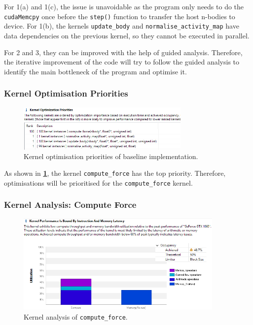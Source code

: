 \documentclass[12pt, a4paper]{article}
\let\oldcref\cref
\renewcommand{\cref}[1]{\textbf{\oldcref{#1}}}
\begin{document}
For 1(a) and 1(c), the issue is unavoidable as the program only needs to do the \texttt{cudaMemcpy}
once before the \texttt{step()} function to transfer the host n-bodies to device. For 1(b), the
kernels \texttt{update\_body} and \texttt{normalise\_activity\_map} have data dependencies on the
previous kernel, so they cannot be executed in parallel.

For 2 and 3, they can be improved with the help of guided analysis. Therefore, the iterative
improvement of the code will try to follow the guided analysis to identify the main bottleneck of
the program and optimise it.

\subsubsection{Kernel Optimisation Priorities}
\begin{figure}[H]
  \centering
  \includegraphics[width=0.75\textwidth]{images/baseline_kernel_optimisation_priorities.png}
  \caption{Kernel optimisation priorities of baseline implementation.}
  \label{figure:baseline_kernel_optimisation_priority}
\end{figure}

As shown in \cref{figure:baseline_kernel_optimisation_priority}, the kernel \texttt{compute\_force}
has the top priority. Therefore, optimisations will be prioritised for the \texttt{compute\_force}
kernel.

\subsubsection{Kernel Analysis: Compute Force}
\begin{figure}[H]
  \centering
  \includegraphics[width=0.9\textwidth]{images/baseline_kernel_analysis_compute_force.png}
  \caption{Kernel analysis of \texttt{compute\_force}.}
  \label{figure:baseline_kernel_analysis_compute_force}
\end{figure}
\end{document}
